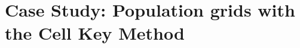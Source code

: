\documentclass[openany,oneside]{book}
\begin{document}
\chapter{Case Study: Population grids with the Cell Key Method} \label{sec:cs_ckm}
    
    
\cleardoublepage
{}
{}





\printglossaries
\end{document}
